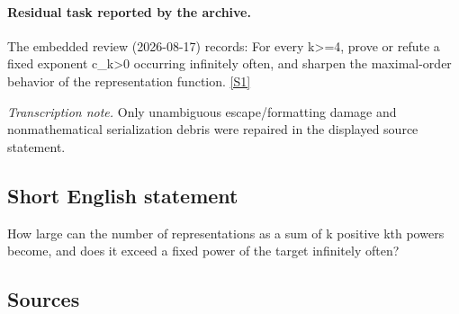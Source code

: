 \documentclass[11pt,a4paper]{article}
\newcommand{\sref}[2]{\hyperlink{source:#1:#2}{[S#2]}}
\begin{document}
\paragraph{Residual task reported by the archive.}

The embedded review (2026-08-17) records: For every k>=4, prove or refute a fixed exponent c\_k>0 occurring infinitely often, and sharpen the maximal-order behavior of the representation function. \sref{2048}{1}

{\small\emph{Transcription note.} Only unambiguous escape/formatting damage and nonmathematical serialization debris were repaired in the displayed source statement.}

\subsection{Short English statement}

How large can the number of representations as a sum of k positive kth powers become, and does it exceed a fixed power of the target infinitely often?

\subsection{Sources}
\end{document}

